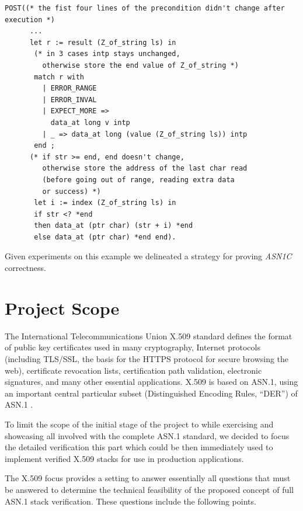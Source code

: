 \documentclass[acmsmall,nonacm]{acmart}
\begin{document}
\begin{lstlisting}[language=Coq]
 POST((* the fist four lines of the precondition didn't change after execution *)
      ... 
      let r := result (Z_of_string ls) in
       (* in 3 cases intp stays unchanged,
         otherwise store the end value of Z_of_string *)
       match r with 
         | ERROR_RANGE 
         | ERROR_INVAL 
         | EXPECT_MORE => 
           data_at long v intp
         | _ => data_at long (value (Z_of_string ls)) intp 
       end ;
      (* if str >= end, end doesn't change, 
         otherwise store the address of the last char read 
         (before going out of range, reading extra data 
         or success) *)
       let i := index (Z_of_string ls) in
       if str <? *end
       then data_at (ptr char) (str + i) *end
       else data_at (ptr char) *end end).
\end{lstlisting}

Given experiments on this example we delineated a strategy for proving
\emph{ASN1C} correctness.

\section{Project Scope}

The International Telecommunications Union X.509 standard
\cite{X509} defines the format of public key certificates used in
many cryptography, Internet protocols (including TLS/SSL, the basis
for the HTTPS protocol for secure browsing the web), certificate
revocation lists, certification path validation, electronic
signatures, and many other essential applications. X.509 is based on
ASN.1, using an important central particular subset (Distinguished
Encoding Rules, ``DER'') of ASN.1 \cite{BERandDER}.

To limit the scope of the initial stage of the project to while
exercising and showcasing all involved with the complete ASN.1
standard, we decided to focus the detailed verification this part
which could be then immediately used to implement verified X.509
stacks for use in production applications.
 
The X.509 focus provides a setting to answer essentially all questions
that must be answered to determine the technical feasibility of the
proposed concept of full ASN.1 stack verification. These questions
include the following points.
\end{document}
